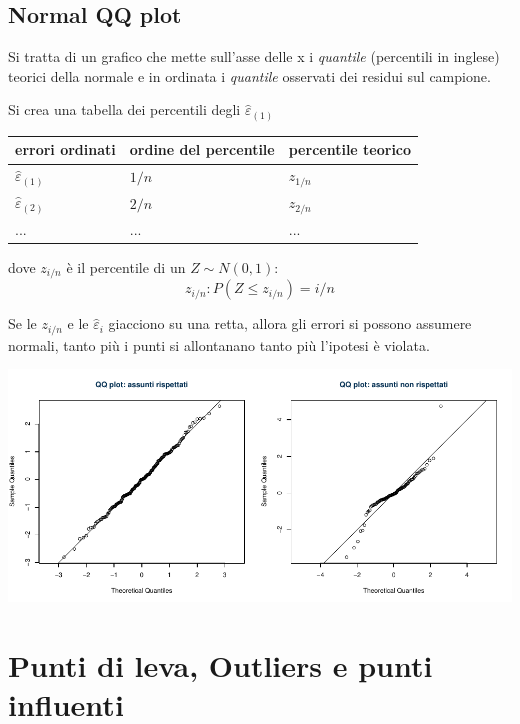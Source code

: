 \documentclass[
  11pt,
]{book}
\theoremstyle{mytheoremstyle}
\theoremstyle{mydefstyle}
\begin{document}
\subsection{Normal QQ plot}\label{normal-qq-plot}

Si tratta di un grafico che mette sull'asse delle x i \emph{quantile} (percentili in inglese) teorici della normale
e in ordinata i \emph{quantile} osservati dei residui sul campione.

Si crea una tabella dei percentili degli \(\hat\varepsilon_{(1)}\)

\begin{longtable}[]{@{}lll@{}}
\toprule\noalign{}
errori ordinati & ordine del percentile & percentile teorico \\
\midrule\noalign{}
\endhead
\bottomrule\noalign{}
\endlastfoot
\(\hat\varepsilon_{(1)}\) & \(1/n\) & \(z_{1/n}\) \\
\(\hat\varepsilon_{(2)}\) & \(2/n\) & \(z_{2/n}\) \\
\(...\) & \(...\) & \(...\) \\
\end{longtable}

dove \(z_{i/n}\) è il percentile di un \(Z\sim N(0,1)\):
\[z_{i/n}: P(Z\leq z_{i/n})=i/n\]

Se le \(z_{i/n}\) e le \(\hat\varepsilon_i\) giacciono su una retta,
allora gli errori si possono assumere normali, tanto più i punti si allontanano
tanto più l'ipotesi è violata.

\begin{center}\includegraphics{Appunti_di_Statistica_2025_files/figure-latex/18-regressione-II-23-1} \end{center}

\section{Punti di leva, Outliers e punti influenti}\label{punti-di-leva-outliers-e-punti-influenti}
\end{document}
